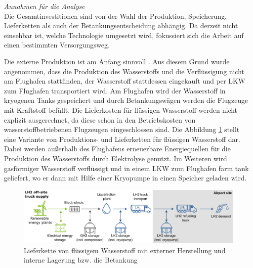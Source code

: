 \textit{Annahmen für die Analyse}\\
Die Gesamtinvestitionen sind von der Wahl der Produktion, Speicherung, 
Lieferketten als auch der Betankungsentscheidung abhängig.
Da derzeit nicht einsehbar ist, welche Technologie umgesetzt wird, 
fokussiert sich die Arbeit auf einen bestimmten Versorgungsweg.

Die externe Produktion ist am Anfang sinnvoll \cite{colpan2022fuel}. 
Aus diesem Grund wurde angenommen, dass die Produktion des Wasserstoffs
und die Verflüssigung nicht am Flughafen stattfinden, 
der Wasserstoff stattdessen eingekauft und per LKW zum Flughafen transportiert wird.
Am Flughafen wird der Wasserstoff in kryogenen Tanks gespeichert 
und durch Betankungswägen werden die Flugzeuge mit Kraftstoff befüllt.
%
Die Lieferkosten für flüssigen Wasserstoff  werden nicht explizit ausgerechnet,
da diese schon in den Betriebskosten von wasserstoffbetriebenen Flugzeugen eingeschlossen sind.
Die Abbildung \ref{supply_wasserstoff} stellt eine Variante von 
Produktions- und Lieferketten für flüssigen Wasserstoff dar.
Dabei werden außerhalb des Flughafens erneuerbare Energiequellen 
für die Produktion des Wasserstoffs durch Elektrolyse genutzt.
Im Weiteren wird gasförmiger Wasserstoff verflüssigt und 
in einem LKW zum Flughafen \glqq farm tank \grqq{} geliefert, 
wo er dann mit Hilfe einer Kryopumpe in einen Speicher geladen wird.
\begin{figure}[h]
	\centering
	\includegraphics[width=0.9\linewidth]{Bilder/Supply_hydrogen.png}
	\caption[Lieferkette von flüssigem Wasserstoff mit externer Herstellung und interner Lagerung bzw. die Betankung]{Lieferkette von flüssigem Wasserstoff mit externer Herstellung und interne Lagerung bzw. die Betankung \cite{schenke2024lh2}}
	\label{supply_wasserstoff}
\end{figure}

